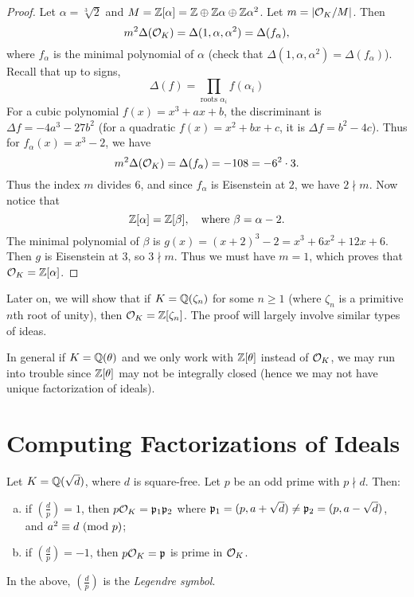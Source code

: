 \begin{proof}
  Let $\alpha = \sqrt[3]{2}$ and
  $M = \mathbb{Z}[\alpha] = \mathbb{Z} \oplus \mathbb{Z} \alpha \oplus \mathbb{Z} \alpha^2$.
  Let $m = |\mathcal{O}_K / M|$. Then
  \[
    m^2 \Delta(\mathcal{O}_K)
    = \Delta(1, \alpha, \alpha^2)
    = \Delta(f_\alpha),
  \]
  where $f_\alpha$ is the minimal polynomial of
  $\alpha$ (check that $\Delta(1, \alpha, \alpha^2) = \Delta(f_\alpha)$).
  Recall that up to signs,
  \[
    \Delta(f) = \prod_{\text{roots } \alpha_i} f(\alpha_i)
  \]
  For a cubic polynomial $f(x) = x^3 + ax + b$, the
  discriminant is $\Delta f = -4 a^3 - 27b^2$ (for a quadratic
  $f(x) = x^2 + bx + c$, it is $\Delta f = b^2 - 4c$).
  Thus for $f_\alpha(x) = x^3 - 2$, we have
  \[
    m^2 \Delta(\mathcal{O}_K) = \Delta(f_\alpha) = -108
    = -6^2 \cdot 3.
  \]
  Thus the index $m$ divides $6$, and since
  $f_\alpha$ is Eisenstein at $2$, we have
  $2 \nmid m$. Now notice that
  \[
    \mathbb{Z}[\alpha] = \mathbb{Z}[\beta], \quad \text{where } \beta = \alpha - 2.
  \]
  The minimal polynomial of $\beta$ is
  $g(x) = (x + 2)^3 - 2 = x^3 + 6x^2 + 12x + 6$. Then
  $g$ is Eisenstein at $3$, so $3 \nmid m$. Thus
  we must have $m = 1$, which proves that
  $\mathcal{O}_K = \mathbb{Z}[\alpha]$.
\end{proof}

\begin{remark}
  Later on, we will show that if
  $K = \mathbb{Q}(\zeta_n)$ for some $n \ge 1$ (where
  $\zeta_n$ is a primitive $n$th root of unity), then
  $\mathcal{O}_K = \mathbb{Z}[\zeta_n]$. The proof will largely
  involve similar types of ideas.
\end{remark}

\begin{remark}
  In general if $K = \mathbb{Q}(\theta)$ and we only work
  with $\mathbb{Z}[\theta]$ instead of $\mathcal{O}_K$, we may run
  into trouble since $\mathbb{Z}[\theta]$ may not be
  integrally closed (hence we may not have unique
  factorization of ideals).
\end{remark}

\section{Computing Factorizations of Ideals}
\begin{prop}
  Let $K = \mathbb{Q}(\sqrt{d})$, where $d$ is square-free.
  Let $p$ be an odd prime with $p \nmid d$. Then:
  \begin{enumerate}[(a)]
    \item if $(\frac{d}{p}) = 1$,
      then $p \mathcal{O}_K = \mathfrak{p}_1 \mathfrak{p}_2$ where
      $\mathfrak{p}_1 = (p, a + \sqrt{d}) \ne \mathfrak{p}_2 = (p, a - \sqrt{d})$, and $a^2 \equiv d \ (\mathrm{mod}\ p)$;
    \item if $(\frac{d}{p}) = -1$, then $p \mathcal{O}_K = \mathfrak{p}$
      is prime in $\mathcal{O}_K$.
  \end{enumerate}
  In the above, $(\frac{d}{p})$ is the
  \emph{Legendre symbol}.
\end{prop}

